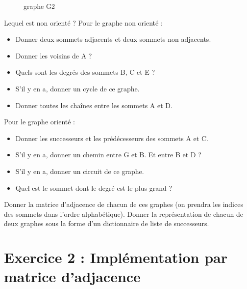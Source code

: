\documentclass[12pt]{book}
\begin{document}
\begin{SCfigure}
\caption{graphe G2}
\end{SCfigure}

\Quest[1] Lequel est non orienté ?
\Quest  Pour le graphe non orienté :
  \begin{itemize}
  \tightlist
  \item Donner deux sommets adjacents et deux sommets non adjacents.
  \item Donner les voisins de A ?
  \item Quels sont les degrés des sommets B, C et E ?
  \item S'il y en a, donner un cycle de ce graphe.
  \item Donner toutes les chaînes entre les sommets A et D.
  \end{itemize}
\Quest Pour le graphe orienté :
  \begin{itemize}
  \tightlist
  \item Donner les successeurs et les prédécesseurs des sommets A et C.
  \item S'il y en a, donner un chemin entre G et B. Et entre B et D ?
  \item S'il y en a, donner un circuit de ce graphe.
  \item Quel est le sommet dont le degré est le plus grand ?
  \end{itemize}
\Quest Donner la matrice d'adjacence de chacun de ces graphes (on prendra les indices des sommets dans l'ordre alphabétique).
\Quest Donner la représentation de chacun de deux graphes sous la forme d'un dictionnaire de liste de successeurs.

\begin{sol}
 
\end{sol}

\section{Exercice 2 : Implémentation par matrice d'adjacence}\label{exercice-3-impluxe9mentation-par-matrice-dadjacence}
\end{document}

